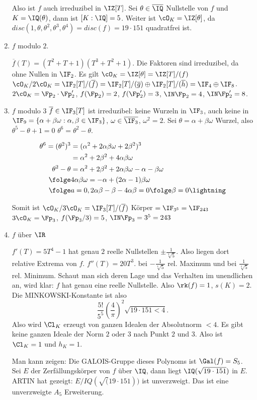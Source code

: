 \begin{Beispiel}[E. ARTIN]
\begin{enumerate}
 Also ist $f$ auch irreduzibel in $\IZ[T]$. Sei $\theta\in\overline{\IQ}$ Nullstelle von $f$ und $K=\IQ(\theta)$, dann ist $[K:\IQ]=5$. Weiter ist $\cO_K=\IZ[\theta]$, da $disc(1,\theta,\theta^2,\theta^3,\theta^4)=disc(f)=19\cdot151$ quadratfrei ist.
 \item $f$ modulo $2$.
 
 $\overline{f}(T)=(T^2+T+1)(T^3+T^2+1)$. Die Faktoren sind irreduzibel, da ohne Nullen in $\IF_2$. Es gilt $\cO_K=\IZ[\theta]=\IZ[T]/(f)$ \folge $\cO_K/2\cO_K=\IF_2[T]/(\overline{f})=\IF_2[T]/(\overline g) \oplus \IF_2[T]/(\overline h)=\IF_4\oplus \IF_8$. \folge $2\cO_K=\Fp_2\cdot\Fp_2'$, $f(\Fp_2)=2$, $f(\Fp_2')=3$, $\IN\Fp_2=4$, $\IN\Fp_2'=8$.
 
 \item $f$ modulo $3$
 $\overline{f}\in\IF_3[T]$ ist irreduzibel: keine Wurzeln in $\IF_3$, auch keine in $\IF_9=\{ \alpha + \beta\omega: \alpha,\beta\in\IF_3\}$, $\omega\in\overline{\IF_3}$, $\omega^2=2$. Sei $\theta=\alpha+\beta\omega$ Wurzel, also $\theta^5-\theta+1=0$ \folge $\theta^6=\theta^2-\theta$.
 
 \begin{align*}
  \theta^6 = (\theta^2)^3&=(\alpha^2+2\alpha\beta\omega+2\beta^2)^3\\
  &= \alpha^2+ 2\beta^2+ 4\alpha\beta\omega\\
  \theta^2-\theta & = \alpha^2+2\beta^2+2\alpha\beta\omega-\alpha-\beta\omega\\
  \folge & 4\alpha\beta\omega = -\alpha+(2\alpha-1)\beta\omega\\
  \folge & a=0, 2\alpha\beta-\beta-4\alpha\beta=0 \folge \beta=0 \lightning
 \end{align*}

 Somit ist $\cO_K/3\cO_K=\IF_3[T]/(\overline{f})$ Körper $=\IF_{3^5}=\IF_{243}$ \folge $3\cO_K=\Fp_3$, $f(\Fp_3/3)=5$, $\IN\Fp_3=3^5=243$
 \item $f$ über $\IR$
 
 $f'(T)=5T^4-1$ hat genau $2$ reelle Nullstellen $\pm\frac{1}{\sqrt[4]{5}}$. Also liegen dort relative Extrema von $f$. $f''(T)=20T^3$. \folge bei $-\frac{1}{\sqrt[4]{5}}$ rel. Maximum und bei $\frac{1}{\sqrt[4]{5}}$ rel. Minimum. Schaut man sich deren Lage und das Verhalten im unendlichen an, wird klar: $f$ hat genau eine reelle Nullstelle. Also $\rk(f)=1$, $s(K)=2$. Die MINKOWSKI-Konstante ist also 
 \[ \frac{5!}{5^5} \left( \frac{4}{\pi}\right)^2\sqrt{19\cdot151 < 4}.\]
 Also wird $\Cl_K$ erzeugt von ganzen Idealen der Absolutnorm $<4$. Es gibt keine ganzen Ideale der Norm $2$ oder $3$ nach Punkt $2$ und $3$. Also ist $\Cl_K=1$ und $h_K=1$.
 
 Man kann zeigen: Die GALOIS-Gruppe dieses Polynoms ist $\Gal(f)=S_5$. Sei $E$ der Zerfällungskörper von $f$ über $\IQ$, dann liegt $\IQ(\sqrt{19\cdot 151})$ in $E$. ARTIN hat gezeigt: $E/IQ(\sqrt(19\cdot 151))$ ist unverzweigt. Das ist eine unverzweigte $A_5$ Erweiterung. 
\end{enumerate}

  \end{Beispiel}



